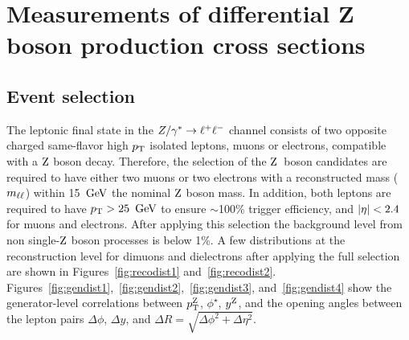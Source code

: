 \chapter{Measurements of differential Z boson production cross sections}
\section{Event selection}
The leptonic final state in the $Z/\gamma^*\to\ell^+\ell^-$ channel consists of two opposite 
charged same-flavor high $p_{\mathrm{T}}$ isolated leptons, muons or electrons, 
compatible with a $\mathrm{Z}$ boson decay. Therefore, the selection of the 
$\mathrm{Z}$~boson candidates are required to have either two muons or two electrons 
with a reconstructed mass ($m_{\ell\ell}$) within 15 $\,\text{Ge\hspace{-.08em}V}$ the nominal $\mathrm{Z}$ boson mass. In addition, 
both leptons are required to have $p_{\mathrm{T}}>25~\,\text{Ge\hspace{-.08em}V}$ to ensure $\sim$100\% trigger 
efficiency, and $\lvert \eta \rvert<2.4$ for muons and electrons. 
After applying this selection the background level from non single-$\mathrm{Z}$ boson 
processes is below 1\%. A few distributions at the reconstruction level 
for dimuons and dielectrons after applying the full selection are 
shown in Figures~\ref{fig:recodist1} and~\ref{fig:recodist2}. 
Figures~\ref{fig:gendist1},~\ref{fig:gendist2},~\ref{fig:gendist3}, and~\ref{fig:gendist4} show the generator-level
correlations between $p_{\mathrm{T}}^{\mathrm{Z}}$, $\phi^\star$, $y^{\mathrm{Z}}$, and the opening angles between the lepton pairs $\Delta\phi$, $\Delta y$, and 
$\Delta R = \sqrt{ \Delta\phi^{2} + \Delta\eta^{2} }$.

